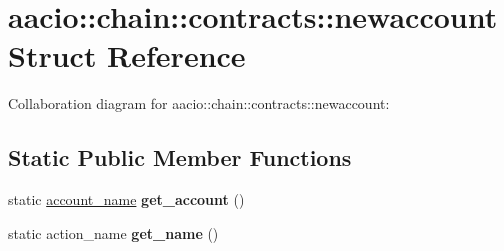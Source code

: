 \hypertarget{structaacio_1_1chain_1_1contracts_1_1newaccount}{}\section{aacio\+:\+:chain\+:\+:contracts\+:\+:newaccount Struct Reference}
\label{structaacio_1_1chain_1_1contracts_1_1newaccount}


Collaboration diagram for aacio\+:\+:chain\+:\+:contracts\+:\+:newaccount\+:
\subsection*{Static Public Member Functions}
\begin{DoxyCompactItemize}
\item 
\mbox{\label{structaacio_1_1chain_1_1contracts_1_1newaccount_a6efb5fd44a14038c05aeaf2ce856b727}} 
static \mbox{\hyperlink{structaacio_1_1chain_1_1name}{account\+\_\+name}} {\bfseries get\+\_\+account} ()
\item 
\mbox{\label{structaacio_1_1chain_1_1contracts_1_1newaccount_a8e0e6df44999b778608fba0262d256a0}} 
static action\+\_\+name {\bfseries get\+\_\+name} ()
\end{DoxyCompactItemize}
